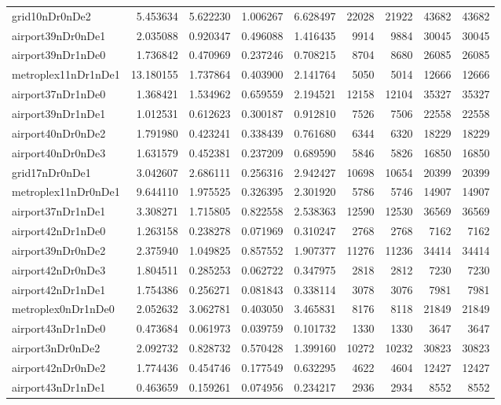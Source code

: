 \begin{longtable}{|l|r|r|r|r|r|r|r|r|}
grid10nDr0nDe2 & 5.453634 & 5.622230 & 1.006267 & 6.628497 & 22028 & 21922 & 43682 & 43682 \\
airport39nDr0nDe1 & 2.035088 & 0.920347 & 0.496088 & 1.416435 & 9914 & 9884 & 30045 & 30045 \\
airport39nDr1nDe0 & 1.736842 & 0.470969 & 0.237246 & 0.708215 & 8704 & 8680 & 26085 & 26085 \\
metroplex11nDr1nDe1 & 13.180155 & 1.737864 & 0.403900 & 2.141764 & 5050 & 5014 & 12666 & 12666 \\
airport37nDr1nDe0 & 1.368421 & 1.534962 & 0.659559 & 2.194521 & 12158 & 12104 & 35327 & 35327 \\
airport39nDr1nDe1 & 1.012531 & 0.612623 & 0.300187 & 0.912810 & 7526 & 7506 & 22558 & 22558 \\
airport40nDr0nDe2 & 1.791980 & 0.423241 & 0.338439 & 0.761680 & 6344 & 6320 & 18229 & 18229 \\
airport40nDr0nDe3 & 1.631579 & 0.452381 & 0.237209 & 0.689590 & 5846 & 5826 & 16850 & 16850 \\
grid17nDr0nDe1 & 3.042607 & 2.686111 & 0.256316 & 2.942427 & 10698 & 10654 & 20399 & 20399 \\
metroplex11nDr0nDe1 & 9.644110 & 1.975525 & 0.326395 & 2.301920 & 5786 & 5746 & 14907 & 14907 \\
airport37nDr1nDe1 & 3.308271 & 1.715805 & 0.822558 & 2.538363 & 12590 & 12530 & 36569 & 36569 \\
airport42nDr1nDe0 & 1.263158 & 0.238278 & 0.071969 & 0.310247 & 2768 & 2768 & 7162 & 7162 \\
airport39nDr0nDe2 & 2.375940 & 1.049825 & 0.857552 & 1.907377 & 11276 & 11236 & 34414 & 34414 \\
airport42nDr0nDe3 & 1.804511 & 0.285253 & 0.062722 & 0.347975 & 2818 & 2812 & 7230 & 7230 \\
airport42nDr1nDe1 & 1.754386 & 0.256271 & 0.081843 & 0.338114 & 3078 & 3076 & 7981 & 7981 \\
metroplex0nDr1nDe0 & 2.052632 & 3.062781 & 0.403050 & 3.465831 & 8176 & 8118 & 21849 & 21849 \\
airport43nDr1nDe0 & 0.473684 & 0.061973 & 0.039759 & 0.101732 & 1330 & 1330 & 3647 & 3647 \\
airport3nDr0nDe2 & 2.092732 & 0.828732 & 0.570428 & 1.399160 & 10272 & 10232 & 30823 & 30823 \\
airport42nDr0nDe2 & 1.774436 & 0.454746 & 0.177549 & 0.632295 & 4622 & 4604 & 12427 & 12427 \\
airport43nDr1nDe1 & 0.463659 & 0.159261 & 0.074956 & 0.234217 & 2936 & 2934 & 8552 & 8552 \\

\end{longtable}
